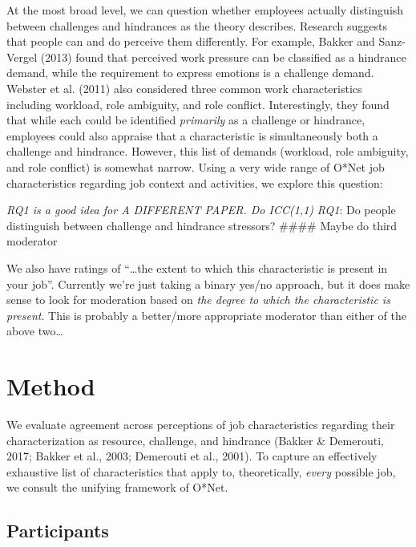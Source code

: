 \documentclass[
  man]{apa6}
\begin{document}
At the most broad level, we can question whether employees actually distinguish between challenges and hindrances as the theory describes. Research suggests that people can and do perceive them differently. For example, Bakker and Sanz-Vergel (2013) found that perceived work pressure can be classified as a hindrance demand, while the requirement to express emotions is a challenge demand. Webster et al. (2011) also considered three common work characteristics including workload, role ambiguity, and role conflict. Interestingly, they found that while each could be identified \emph{primarily} as a challenge or hindrance, employees could also appraise that a characteristic is simultaneously both a challenge and hindrance. However, this list of demands (workload, role ambiguity, and role conflict) is somewhat narrow. Using a very wide range of O*Net job characteristics regarding job context and activities, we explore this question:

\emph{RQ1 is a good idea for A DIFFERENT PAPER. Do ICC(1,1)}
\emph{RQ1}: Do people distinguish between challenge and hindrance stressors?
\#\#\#\# Maybe do third moderator

We also have ratings of ``\ldots the extent to which this characteristic is present in your job''. Currently we're just taking a binary yes/no approach, but it does make sense to look for moderation based on \emph{the degree to which the characteristic is present}. This is probably a better/more appropriate moderator than either of the above two\ldots{}

\hypertarget{method}{%
\section{Method}\label{method}}

We evaluate agreement across perceptions of job characteristics regarding their characterization as resource, challenge, and hindrance (Bakker \& Demerouti, 2017; Bakker et al., 2003; Demerouti et al., 2001). To capture an effectively exhaustive list of characteristics that apply to, theoretically, \emph{every} possible job, we consult the unifying framework of O*Net.

\hypertarget{participants}{%
\subsection{Participants}\label{participants}}
\end{document}
